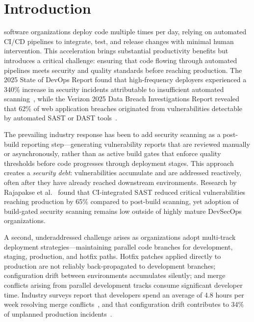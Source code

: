 \documentclass[journal]{IEEEtran}
\begin{document}

\section{Introduction}
 software organizations deploy code multiple times per day, relying on automated CI/CD pipelines to integrate, test, and release changes with minimal human intervention. This acceleration brings substantial productivity benefits but introduces a critical challenge: ensuring that code flowing through automated pipelines meets security and quality standards before reaching production. The 2025 State of DevOps Report found that high-frequency deployers experienced a 340\% increase in security incidents attributable to insufficient automated scanning~\cite{forsgren2025}, while the Verizon 2025 Data Breach Investigations Report revealed that 62\% of web application breaches originated from vulnerabilities detectable by automated SAST or DAST tools~\cite{verizon2025}.

The prevailing industry response has been to add security scanning as a post-build reporting step---generating vulnerability reports that are reviewed manually or asynchronously, rather than as active build gates that enforce quality thresholds before code progresses through deployment stages. This approach creates a \textit{security debt}: vulnerabilities accumulate and are addressed reactively, often after they have already reached downstream environments. Research by Rajapakse et al.~\cite{rajapakse2022} found that CI-integrated SAST reduced critical vulnerabilities reaching production by 65\% compared to post-build scanning, yet adoption of build-gated security scanning remains low outside of highly mature DevSecOps organizations.

A second, underaddressed challenge arises as organizations adopt multi-track deployment strategies---maintaining parallel code branches for development, staging, production, and hotfix paths. Hotfix patches applied directly to production are not reliably back-propagated to development branches; configuration drift between environments accumulates silently; and merge conflicts arising from parallel development tracks consume significant developer time. Industry surveys report that developers spend an average of 4.8 hours per week resolving merge conflicts~\cite{sadowski2018}, and that configuration drift contributes to 34\% of unplanned production incidents~\cite{puppet2024}.
\end{document}

